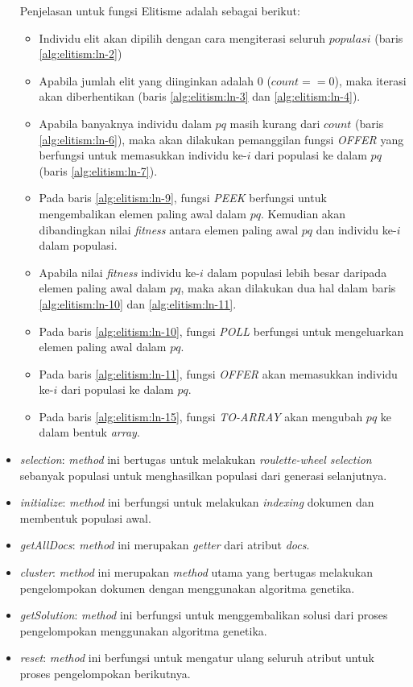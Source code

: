 \begin{itemize}
\pagebreak
	Penjelasan untuk fungsi  Elitisme adalah sebagai berikut:
	\begin{itemize}
		\item Individu elit akan dipilih dengan cara mengiterasi seluruh $populasi$ (baris \ref{alg:elitism:ln-2})
		\item Apabila jumlah elit yang diinginkan adalah 0 ($count ==0$), maka iterasi akan diberhentikan (baris \ref{alg:elitism:ln-3} dan \ref{alg:elitism:ln-4}).
		\item Apabila banyaknya individu dalam $pq$ masih kurang dari $count$ (baris \ref{alg:elitism:ln-6}), maka akan dilakukan pemanggilan fungsi \textit{OFFER} yang berfungsi untuk memasukkan individu ke-$i$ dari populasi ke dalam $pq$ (baris \ref{alg:elitism:ln-7}).
		\item Pada baris \ref{alg:elitism:ln-9}, fungsi \textit{PEEK} berfungsi untuk mengembalikan elemen paling awal dalam $pq$. Kemudian akan dibandingkan nilai \textit{fitness} antara elemen paling awal $pq$ dan individu ke-$i$ dalam populasi.
		\item Apabila nilai \textit{fitness} individu ke-$i$ dalam populasi lebih besar daripada elemen paling awal dalam $pq$, maka akan dilakukan dua hal dalam baris \ref{alg:elitism:ln-10} dan \ref{alg:elitism:ln-11}.\
		\item Pada baris \ref{alg:elitism:ln-10}, fungsi \textit{POLL} berfungsi untuk mengeluarkan elemen paling awal dalam $pq$.
		\item Pada baris \ref{alg:elitism:ln-11}, fungsi \textit{OFFER} akan memasukkan individu ke-$i$ dari populasi ke dalam $pq$.
		\item Pada baris \ref{alg:elitism:ln-15}, fungsi \textit{TO-ARRAY} akan mengubah $pq$ ke dalam bentuk \textit{array}.
	\end{itemize}
	
	\item \textit{selection}: \textit{method} ini bertugas untuk melakukan \textit{roulette-wheel selection} sebanyak populasi untuk menghasilkan populasi dari generasi selanjutnya.
	\item \textit{initialize}: \textit{method} ini berfungsi untuk melakukan \textit{indexing} dokumen dan membentuk populasi awal.
	\item \textit{getAllDocs}: \textit{method} ini merupakan \textit{getter} dari atribut \textit{docs}.
	\item \textit{cluster}: \textit{method} ini merupakan \textit{method} utama yang bertugas melakukan pengelompokan dokumen dengan menggunakan algoritma genetika.
	\item \textit{getSolution}: \textit{method} ini berfungsi untuk menggembalikan solusi dari proses pengelompokan menggunakan algoritma genetika.
	\item \textit{reset}: \textit{method} ini berfungsi untuk mengatur ulang seluruh atribut untuk proses pengelompokan berikutnya.
\end{itemize}

